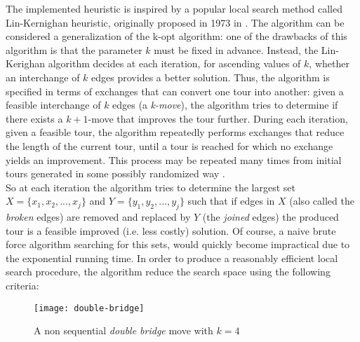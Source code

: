 The implemented heuristic is inspired by a popular local search method called Lin-Kernighan heuristic, originally proposed in 1973 in \cite{LinK73}. The algorithm can be considered a generalization of the k-opt algorithm: one of the drawbacks of this algorithm is that the parameter $k$ must be fixed in advance. Instead, the Lin-Kerighan algorithm decides at each iteration, for ascending values of $k$, whether an interchange of $k$ edges provides a better solution. Thus, the algorithm is specified in terms of exchanges that can convert one tour into another: given a feasible interchange of $k$ edges (a \textit{k-move}), the algorithm tries to determine if there exists a $k+1$-move that improves the tour further. 
During each iteration, given a feasible tour, the algorithm repeatedly performs exchanges that reduce the length of the current tour, until a tour is reached for which no exchange yields an improvement. This process may be repeated many times from initial tours generated in some possibly randomized way \cite{Helsgaun2000}.\\
So at each iteration the algorithm tries to determine the largest set $X=\{x_1, x_2, ..., x_j\}$ and $Y=\{y_1, y_2, ..., y_j\}$ such that if edges in $X$ (also called the \emph{broken} edges) are removed and replaced by $Y$ (the \emph{joined} edges) the produced tour is a feasible improved (i.e. less costly) solution. Of course, a naive brute force algorithm searching for this sets, would quickly become impractical due to the exponential running time. In order to produce a reasonably efficient local search procedure, the algorithm reduce the search space using the following criteria:
\begin{figure}[]
	\centering
	\texttt{[image: double-bridge]}
	\caption{A non sequential \emph{double bridge} move with $k=4$}
	\label{fig:doublebridge}
\end{figure}

